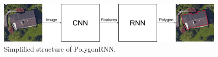 \begin{figure}[!h]
	\centering
	\includegraphics[width=\fig\textwidth]{3-00.pdf}
    \caption{Simplified structure of PolygonRNN.}
    \label{fig:simppoly}
\end{figure}